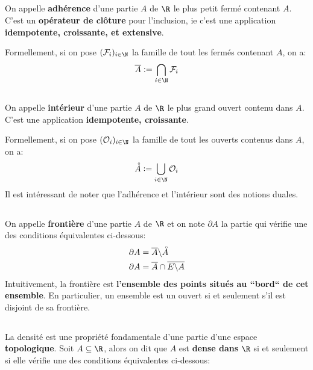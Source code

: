 \subsection*{}
On appelle \textbf{adhérence} d'une partie \(A\) de \(\R\) le plus petit fermé contenant \(A\). C'est un \textbf{opérateur de clôture} pour l'inclusion, ie c'est une application \textbf{idempotente, croissante, et extensive}.\<

Formellement, si on pose \((\mathcal{F}_i)_{i \in \N}\) la famille de tout les fermés contenant \(A\), on a:
\[
    \overline{A} := \bigcap_{i \in \N} \mathcal{F}_i
\]

\subsection*{}
On appelle \textbf{intérieur} d'une partie \(A\) de \(\R\) le plus grand ouvert contenu dans \(A\). C'est une application \textbf{idempotente, croissante}.\<

Formellement, si on pose \((\mathcal{O}_i)_{i \in \N}\) la famille de tout les ouverts contenus dans \(A\), on a:
\[
    \accentset{\circ}{A} := \bigcup_{i \in \N} \mathcal{O}_i
\]
Il est intéressant de noter que l'adhérence et l'intérieur sont des notions duales.


\subsection*{}
On appelle \textbf{frontière} d'une partie \(A\) de \(\R\) et on note \(\partial A\) la partie qui vérifie une des conditions équivalentes ci-dessous:
\begin{align*}
    \partial A &= \overline{A} \backslash \accentset{\circ}{A} \\
    \partial A &= \overline{A} \cap \overline{E \backslash A} \\    
\end{align*}
Intuitivement, la frontière est \textbf{l'ensemble des points situés au ``bord`` de cet ensemble}.\+
En particulier, un ensemble est un ouvert si et seulement s'il est disjoint de sa frontière.

\subsection*{}
La densité est une propriété fondamentale d'une partie d'une espace \textbf{topologique}.
Soit \(A \subseteq \R\), alors on dit que \(A\) est \textbf{dense dans} \(\R\) si et seulement si elle vérifie une des conditions équivalentes ci-dessous:
\begin{center}
\end{center}

